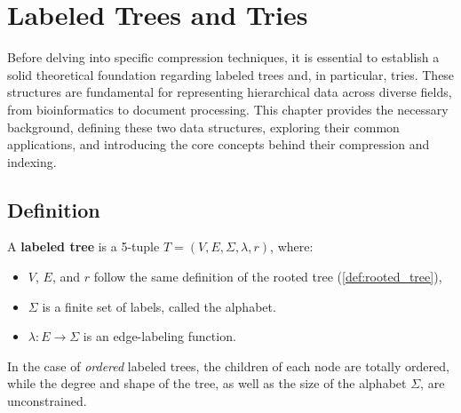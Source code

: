 \section{Labeled Trees and Tries} \label{chp:thbg_labeled_tree}
Before delving into specific compression techniques, it is essential to establish a solid theoretical foundation regarding labeled trees and, in particular, tries.
These structures are fundamental for representing hierarchical data across diverse fields, from bioinformatics to document processing.
This chapter provides the necessary background, defining these two data structures, exploring their common applications, and introducing the core concepts behind their compression and indexing. 

\subsection{Definition}
\begin{definition} \label{def:labeled_tree}
    A \textbf{labeled tree} is a 5-tuple $T = (V, E, \Sigma, \lambda, r)$, where:
    \begin{itemize}
        \item $V$, $E$, and $r$ follow the same definition of the rooted tree (\cref{def:rooted_tree}),
        \item $\Sigma$ is a finite set of labels, called the alphabet.
        \item $\lambda : E \to \Sigma$ is an edge-labeling function.
    \end{itemize}
\end{definition}
In the case of \emph{ordered} labeled trees, the children of each node are totally ordered, while the degree and shape of the tree, as well as the size of the alphabet $\Sigma$, are unconstrained.


